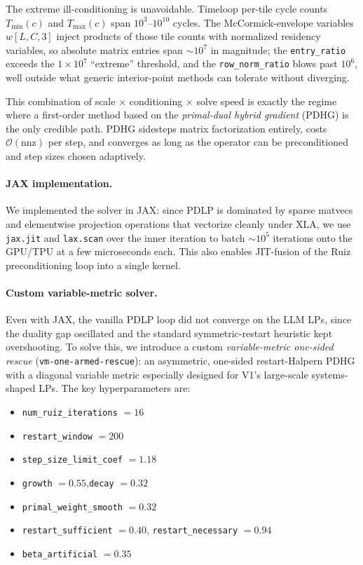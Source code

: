 The extreme ill-conditioning is unavoidable. Timeloop per-tile cycle
counts $T_{\min}(c)$ and $T_{\max}(c)$ span $10^3$--$10^{10}$ cycles.
The McCormick-envelope variables $w[L,C,3]$ inject products of those
tile counts with normalized residency variables, so absolute matrix
entries span ${\sim}10^7$ in magnitude; the
\texttt{entry\_ratio} exceeds the $1\times10^7$ ``extreme'' threshold,
and the \texttt{row\_norm\_ratio} blows past $10^6$, well outside what
generic interior-point methods can tolerate without diverging.

This combination of scale $\times$ conditioning $\times$ solve speed is
exactly the regime where a first-order method based on the
\emph{primal-dual hybrid gradient} (PDHG) is the only credible path.
PDHG sidesteps matrix factorization entirely, costs $\mathcal{O}(\text{nnz})$
per step, and converges as long as the operator can be preconditioned and
step sizes chosen adaptively.

\paragraph{JAX implementation.}
We implemented the solver in JAX: since PDLP is dominated by sparse
matvecs and elementwise projection operations that vectorize cleanly
under XLA, we use \texttt{jax.jit} and \texttt{lax.scan} over the inner
iteration to batch ${\sim}10^5$ iterations onto the GPU/TPU at a few
microseconds each. This also enables JIT-fusion of the Ruiz
preconditioning loop into a single kernel.

\paragraph{Custom variable-metric solver.}
Even with JAX, the vanilla PDLP loop did not converge on the LLM LPs, since the duality gap oscillated and the standard symmetric-restart
heuristic kept overshooting. 
To solve this, we introduce a custom
\emph{variable-metric one-sided rescue} (\texttt{vm-one-armed-rescue}):
an asymmetric, one-sided restart-Halpern PDHG with a diagonal variable
metric especially designed for V1's large-scale systems-shaped LPs.
The key hyperparameters are:
\begin{itemize}[leftmargin=1.5em, itemsep=1pt]
    \item \texttt{num\_ruiz\_iterations} $= 16$ 
    \item \texttt{restart\_window} $= 200$ 
    \item \texttt{step\_size\_limit\_coef} $= 1.18$
    \item \texttt{growth} $= 0.55$,\quad \texttt{decay} $= 0.32$
    \item \texttt{primal\_weight\_smooth} $= 0.32$
    \item \texttt{restart\_sufficient} $= 0.40$,\quad
          \texttt{restart\_necessary} $= 0.94$
    \item \texttt{beta\_artificial} $= 0.35$
\end{itemize}

